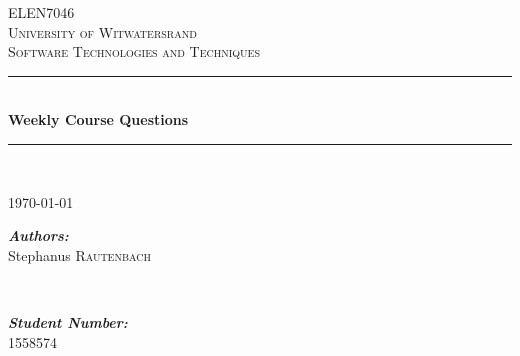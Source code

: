\documentclass[12pt, onecolumn]{witseiepaper}
\begin{document}
\begin{titlepage}
	
	\newcommand{\HRule}{\rule{\linewidth}{0.5mm}} 
	
	\begin{center}
		
		\textsc{\LARGE ELEN7046}\\[0.5cm]
		
		\textsc{\Large University of Witwatersrand}\\[0.25cm]
		
		\textsc{\large Software Technologies and Techniques}\\[0.5cm]
		
		\HRule \\[0.4cm]
		{ \huge \bfseries Weekly Course Questions }\\[0.25cm]
		
		\HRule \\[2.25cm]
		
		\begin{figure}[H]
		\end{figure}
		
		{\large \today}\\[1.25cm]
		
		\begin{minipage}
			{0.4
				\textwidth} 
			\begin{flushleft}
				\large \emph{\textbf{Authors:}}\\
				Stephanus  \textsc{Rautenbach} \\
			\end{flushleft}
		\end{minipage}
		~ 
		\begin{minipage}
			{0.4
				\textwidth} 
			\begin{flushright}
				\large \emph{\textbf{Student Number:}} \\
				1558574  \\
			\end{flushright}
		\end{minipage}
		

\end{center}
\end{titlepage}
\end{document}
